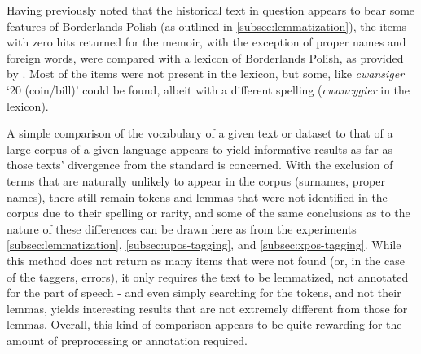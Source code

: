Having previously noted that the historical text in question appears to bear some features of Borderlands Polish (as outlined in \autoref{subsec:lemmatization}), the items with zero hits returned for the memoir, with the exception of proper names and foreign words, were compared with a lexicon of Borderlands Polish, as provided by \citet{kurzowa_1983}. Most of the items were not present in the lexicon, but some, like \textit{cwansiger} `20 (coin/bill)' could be found, albeit with a different spelling (\textit{cwancygier} in the lexicon). 

A simple comparison of the vocabulary of a given text or dataset to that of a large corpus of a given language appears to yield informative results as far as those texts' divergence from the standard is concerned. With the exclusion of terms that are naturally unlikely to appear in the corpus (surnames, proper names), there still remain tokens and lemmas that were not identified in the corpus due to their spelling or rarity, and some of the same conclusions as to the nature of these differences can be drawn here as from the experiments \autoref{subsec:lemmatization}, \autoref{subsec:upos-tagging}, and \autoref{subsec:xpos-tagging}. While this method does not return as many items that were not found (or, in the case of the taggers, errors), it only requires the text to be lemmatized, not annotated for the part of speech - and even simply searching for the tokens, and not their lemmas, yields interesting results that are not extremely different from those for lemmas. Overall, this kind of comparison appears to be quite rewarding for the amount of preprocessing or annotation required.